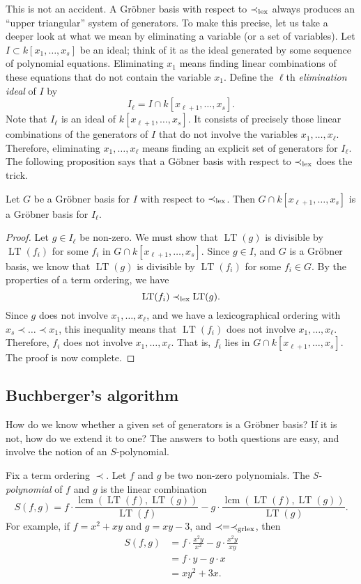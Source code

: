 \documentclass[11pt]{article}
\DeclareMathOperator{\LT}{LT}
\DeclareMathOperator{\lcm}{lcm}
\begin{document}
This is not an accident.
A Gr\"obner basis with respect to $\prec_{\rm lex}$ always produces an ``upper triangular'' system of generators.
To make this precise, let us take a deeper look at what we mean by eliminating a variable (or a set of variables).
Let $I \subset k[x_1,\dots,x_s]$ be an ideal; think of it as the ideal generated by some sequence of polynomial equations.
Eliminating $x_1$ means finding linear combinations of these equations that do not contain the variable $x_1$.
Define the $\ell$th \emph{elimination ideal} of $I$ by
\[ I_{\ell} = I \cap k[x_{\ell+1}, \dots, x_s].\]
Note that $I_{\ell}$ is an ideal of $k[x_{\ell+1},\dots,x_s]$.
It consists of precisely those linear combinations of the generators of $I$ that do not involve the variables $x_1, \dots, x_{\ell}$.
Therefore, eliminating $x_1, \dots, x_{\ell}$ means finding an explicit set of generators for $I_{\ell}$.
The following proposition says that a G\"obner basis with respect to $\prec_{\rm lex}$ does the trick.
\begin{proposition}
  Let $G$ be a Gr\"obner basis for $I$ with respect to $\prec_{\rm lex}$.
  Then $G \cap k[x_{\ell+1}, \dots, x_s]$ is a Gr\"obner basis for $I_{\ell}$.
\end{proposition}
\begin{proof}
  Let $g \in I_{\ell}$ be non-zero.
  We must show that $\LT(g)$ is divisible by $\LT(f_i)$ for some $f_i$ in $G \cap k[x_{\ell+1},\dots,x_s]$.
  Since $g \in I$, and $G$ is a Gr\"obner basis, we know that $\LT(g)$ is divisible by $\LT(f_i)$ for some $f_i \in G$.
  By the properties of a term ordering, we have
  \[ \LT(f_i) \prec_{\rm lex} \LT(g).\]
  Since $g$ does not involve $x_1, \dots, x_\ell$, and we have a lexicographical ordering with $x_s \prec \dots \prec x_1$, this inequality means that $\LT(f_i)$ does not involve $x_1, \dots, x_{\ell}$.
  Therefore, $f_i$ does not involve $x_1, \dots, x_{\ell}$.
  That is, $f_i$ lies in $G \cap k[x_{\ell+1}, \dots, x_s]$.
  The proof is now complete.  
\end{proof}

\subsection{Buchberger's algorithm}
How do we know whether a given set of generators is a Gr\"obner basis?
If it is not, how do we extend it to one?
The answers to both questions are easy, and involve the notion of an $S$-polynomial.

Fix a term ordering $\prec$.
Let $f$ and $g$ be two non-zero polynomials.
The \emph{S-polynomial} of $f$ and $g$ is the linear combination
\[ S(f,g) = f \cdot \frac{\lcm(\LT(f), \LT(g))}{\LT(f)} - g \cdot \frac{\lcm(\LT(f), \LT(g))}{\LT(g)}. \]
For example, if $f = x^2 + xy$ and $g = xy - 3$, and $\prec = \prec_{\rm grlex}$, then
\begin{align*}
  S(f,g) &= f \cdot \frac{x^2y}{x^2} - g \cdot \frac{x^2y}{xy}\\
         &= f \cdot y - g \cdot x \\
         &=xy^2+3x.
\end{align*}
\end{document}
